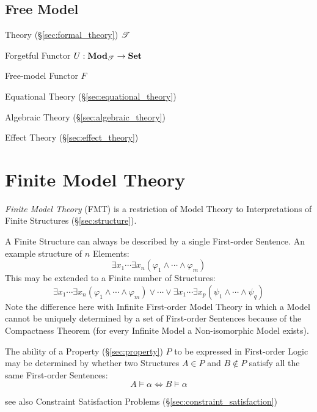 \subsection{Free Model}\label{sec:free_model}

Theory (\S\ref{sec:formal_theory}) $\mathscr{T}$

Forgetful Functor $U : \mathbf{Mod}_\mathscr{T} \rightarrow \mathbf{Set}$

Free-model Functor $F$

Equational Theory (\S\ref{sec:equational_theory})

Algebraic Theory (\S\ref{sec:algebraic_theory})

Effect Theory (\S\ref{sec:effect_theory})



\section{Finite Model Theory}\label{sec:finite_model}

\emph{Finite Model Theory} (FMT) is a restriction of Model Theory to
Interpretations of Finite Structures (\S\ref{sec:structure}).

A Finite Structure can always be described by a single First-order
Sentence. An example structure of $n$ Elements:
\[
  \exists x_1 \cdots \exists x_n ( \varphi_1 \wedge \cdots \wedge
  \varphi_m )
\]
This may be extended to a Finite number of Structures:
\[
  \exists x_1 \cdots \exists x_n ( \varphi_1 \wedge \cdots \wedge
  \varphi_m )
  \vee
  \cdots
  \vee
  \exists x_1 \cdots \exists x_p ( \psi_1 \wedge \cdots \wedge
  \psi_q )
\]
Note the difference here with Infinite First-order Model Theory in
which a Model cannot be uniquely determined by a set of First-order
Sentences because of the Compactness Theorem (for every Infinite Model
a Non-isomorphic Model exists).

The ability of a Property (\S\ref{sec:property}) $P$ to be expressed
in First-order Logic may be determined by whether two Structures $A
\in P$ and $B \notin P$ satisfy all the same First-order Sentences:
\[
  A \models \alpha \Leftrightarrow B \models \alpha
\]

\fist see also Constraint Satisfaction Problems
(\S\ref{sec:constraint_satisfaction})



